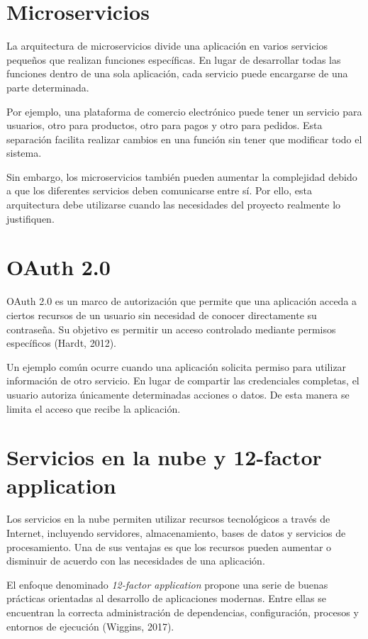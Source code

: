 \documentclass[12pt,letterpaper]{article}
\begin{document}
\section*{Microservicios}

La arquitectura de microservicios divide una aplicación en varios servicios pequeños que realizan funciones específicas. En lugar de desarrollar todas las funciones dentro de una sola aplicación, cada servicio puede encargarse de una parte determinada.

Por ejemplo, una plataforma de comercio electrónico puede tener un servicio para usuarios, otro para productos, otro para pagos y otro para pedidos. Esta separación facilita realizar cambios en una función sin tener que modificar todo el sistema.

Sin embargo, los microservicios también pueden aumentar la complejidad debido a que los diferentes servicios deben comunicarse entre sí. Por ello, esta arquitectura debe utilizarse cuando las necesidades del proyecto realmente lo justifiquen.

\section*{OAuth 2.0}

OAuth 2.0 es un marco de autorización que permite que una aplicación acceda a ciertos recursos de un usuario sin necesidad de conocer directamente su contraseña. Su objetivo es permitir un acceso controlado mediante permisos específicos (Hardt, 2012).

Un ejemplo común ocurre cuando una aplicación solicita permiso para utilizar información de otro servicio. En lugar de compartir las credenciales completas, el usuario autoriza únicamente determinadas acciones o datos. De esta manera se limita el acceso que recibe la aplicación.

\section*{Servicios en la nube y 12-factor application}

Los servicios en la nube permiten utilizar recursos tecnológicos a través de Internet, incluyendo servidores, almacenamiento, bases de datos y servicios de procesamiento. Una de sus ventajas es que los recursos pueden aumentar o disminuir de acuerdo con las necesidades de una aplicación.

El enfoque denominado \textit{12-factor application} propone una serie de buenas prácticas orientadas al desarrollo de aplicaciones modernas. Entre ellas se encuentran la correcta administración de dependencias, configuración, procesos y entornos de ejecución (Wiggins, 2017).
\end{document}
